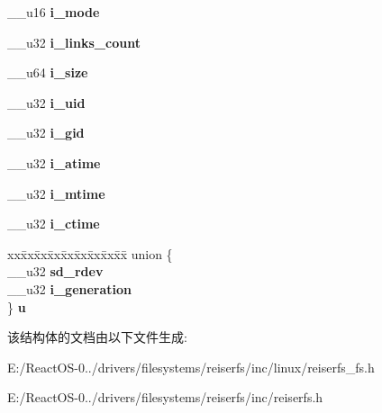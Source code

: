 \begin{DoxyCompactItemize}
\begin{tabbing}
\end{tabbing}\item 
\mbox{\label{structstat__data_a6457be85081db21a1e98aa1534fd7abe}} 
\+\_\+\+\_\+u16 {\bfseries i\+\_\+mode}
\item 
\mbox{\label{structstat__data_a7c208c56b2533ece031df05114a7726d}} 
\+\_\+\+\_\+u32 {\bfseries i\+\_\+links\+\_\+count}
\item 
\mbox{\label{structstat__data_a85c5fba9ed00afa1c7c5432742fbdcee}} 
\+\_\+\+\_\+u64 {\bfseries i\+\_\+size}
\item 
\mbox{\label{structstat__data_af950166ae90ee21dad42102b8c3d77da}} 
\+\_\+\+\_\+u32 {\bfseries i\+\_\+uid}
\item 
\mbox{\label{structstat__data_a4b3fee96034fde01d4722042a5104761}} 
\+\_\+\+\_\+u32 {\bfseries i\+\_\+gid}
\item 
\mbox{\label{structstat__data_abce3a9d9148a77e2069d57533e75f27b}} 
\+\_\+\+\_\+u32 {\bfseries i\+\_\+atime}
\item 
\mbox{\label{structstat__data_ab92e0477d233d0145aad94e7f9d39630}} 
\+\_\+\+\_\+u32 {\bfseries i\+\_\+mtime}
\item 
\mbox{\label{structstat__data_a3bfb5ce2a6327babffabecb9e19afebd}} 
\+\_\+\+\_\+u32 {\bfseries i\+\_\+ctime}
\item 
\mbox{\label{structstat__data_a9448b4e026dfe62219cba32eacd6adf4}} 
\begin{tabbing}
xx\=xx\=xx\=xx\=xx\=xx\=xx\=xx\=xx\=\kill
union \{\\
\>\_\_u32 {\bfseries sd\_rdev}\\
\>\_\_u32 {\bfseries i\_generation}\\
\} {\bfseries u}\\

\end{tabbing}\end{DoxyCompactItemize}


该结构体的文档由以下文件生成\+:\begin{DoxyCompactItemize}
\item 
E\+:/\+React\+O\+S-\/0../drivers/filesystems/reiserfs/inc/linux/reiserfs\+\_\+fs.\+h\item 
E\+:/\+React\+O\+S-\/0../drivers/filesystems/reiserfs/inc/reiserfs.\+h\end{DoxyCompactItemize}
